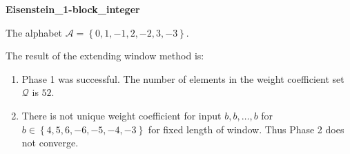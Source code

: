 \begin{exmp}
\textbf{ Eisenstein\_1-block\_integer }

\label{ex:Eisenstein1-blockinteger}

The alphabet $\mathcal{A} =\left\{0, 1, -1, 2, -2, 3, -3\right\}$.

The result of the extending window method is:
\begin{enumerate}
    \item Phase 1 was successful.
The number of elements in the weight coefficient set $\mathcal{Q}$ is $52$.

    \item There is not unique weight coefficient for input $b,b,\dots,b$ for $b\in\left\{4, 5, 6, -6, -5, -4, -3\right\}$ for fixed length of window. Thus Phase 2 does not converge.

\end{enumerate}
\end{exmp}
